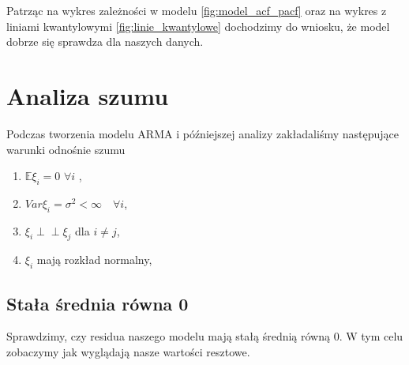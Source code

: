 \documentclass[12pt]{article}
\theoremstyle{exer}
\begin{document}
Patrząc na wykres zależności w modelu \ref{fig:model_acf_pacf} oraz na wykres z liniami kwantylowymi \ref{fig:linie_kwantylowe} dochodzimy do wniosku, że model dobrze się sprawdza dla naszych danych.


	\section{Analiza szumu}
	Podczas tworzenia modelu ARMA i późniejszej analizy zakładaliśmy następujące warunki odnośnie szumu
	\begin{enumerate}
		\item $\mathbb{E}\xi_i=0$ $\forall i$ ,
		\item $Var\xi_i=\sigma^2<\infty\quad\forall i$,
		\item $\xi_i\perp\!\!\!\perp\xi_j$ dla $i\neq j$,
		\item $\xi_i$ mają rozkład normalny,
	\end{enumerate}
	
	\subsection{Stała średnia równa 0}
	Sprawdzimy, czy residua naszego modelu mają stałą średnią równą $0$. W tym celu zobaczymy jak wyglądają nasze wartości resztowe.
	
\end{document}
